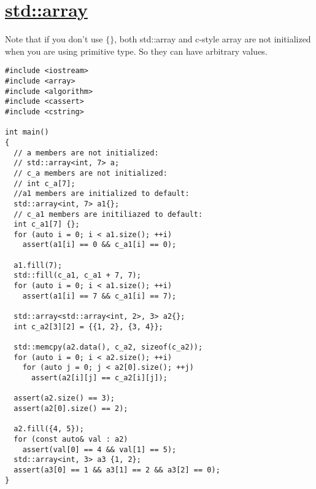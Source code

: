 \documentclass{book}
\begin{document}
	\section{\href{https://en.cppreference.com/w/cpp/container/array}{std::array}}
	Note that if you don't use $\{\}$, both std::array and c-style array are not initialized when you are using primitive type. So they can have arbitrary values.
	\begin{lstlisting}
#include <iostream>
#include <array>
#include <algorithm>
#include <cassert>
#include <cstring>

int main()
{
  // a members are not initialized:
  // std::array<int, 7> a;
  // c_a members are not initialized:
  // int c_a[7];
  //a1 members are initialized to default:
  std::array<int, 7> a1{};
  // c_a1 members are initiliazed to default:
  int c_a1[7] {};
  for (auto i = 0; i < a1.size(); ++i)
    assert(a1[i] == 0 && c_a1[i] == 0);

  a1.fill(7);
  std::fill(c_a1, c_a1 + 7, 7);
  for (auto i = 0; i < a1.size(); ++i)
    assert(a1[i] == 7 && c_a1[i] == 7);

  std::array<std::array<int, 2>, 3> a2{};
  int c_a2[3][2] = {{1, 2}, {3, 4}};

  std::memcpy(a2.data(), c_a2, sizeof(c_a2));
  for (auto i = 0; i < a2.size(); ++i)
    for (auto j = 0; j < a2[0].size(); ++j)
      assert(a2[i][j] == c_a2[i][j]);

  assert(a2.size() == 3);
  assert(a2[0].size() == 2);

  a2.fill({4, 5});
  for (const auto& val : a2)
    assert(val[0] == 4 && val[1] == 5);
  std::array<int, 3> a3 {1, 2};
  assert(a3[0] == 1 && a3[1] == 2 && a3[2] == 0);
}
	\end{lstlisting}
\end{document}
